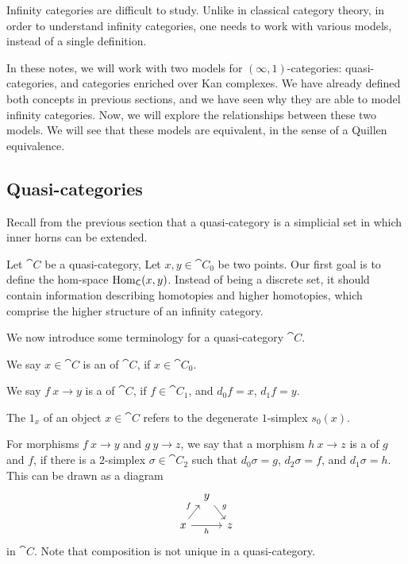 Infinity categories are difficult to study.
Unlike in classical category theory,
in order to understand infinity categories,
one needs to work with various models, instead of a single definition.

In these notes, we will work with two models for $(\infty,1)$-categories:
quasi-categories, and categories enriched over Kan complexes.
We have already defined both concepts in previous sections,
and we have seen why they are able to model infinity categories.
Now, we will explore the relationships between these two models.
We will see that these models are equivalent,
in the sense of a Quillen equivalence.

\subsection{Quasi-categories}

Recall from the previous section that a quasi-category is a simplicial set in which
inner horns can be extended.

Let $\cat C$ be a quasi-category, 
Let $x,y\in\cat C_0$ be two points.
Our first goal is to define the hom-space $\operatorname{Hom}_{\mathsf{C}}(x,y)$.
Instead of being a discrete set, it should contain information
describing homotopies and higher homotopies, 
which comprise the higher structure of an infinity category.

We now introduce some terminology for
a quasi-category $\cat C$.
\begin{itms}
    \item We say $x\in\cat C$ is an  of $\cat C$, if $x\in\cat C_0$.
    \item We say $f\:x\to y$ is a  of $\cat C$, if $f\in\cat C_1$,
    and $d_0f=x$, $d_1f=y$.
    \item The  $1_x$ of an object $x\in\cat C$
    refers to the degenerate $1$-simplex $s_0(x)$.
    \item For morphisms $f\:x\to y$ and $g\:y\to z$,
    we say that a morphism $h\:x\to z$
    is a  of $g$ and $f$, if 
    there is a $2$-simplex $\sigma\in\cat C_2$ such that 
    $d_0\sigma=g$, $d_2\sigma=f$, and $d_1\sigma=h$.
    This can be drawn as a diagram
    \[\begin{tikzcd}[row sep=3ex,column sep=.7em]
        & y\ar[dr,"g"] \\
        x\ar[ur,"f"]\ar[rr,"h"'] && z
    \end{tikzcd}\]
    in $\cat C$. Note that composition is not unique in a quasi-category.
\end{itms}

